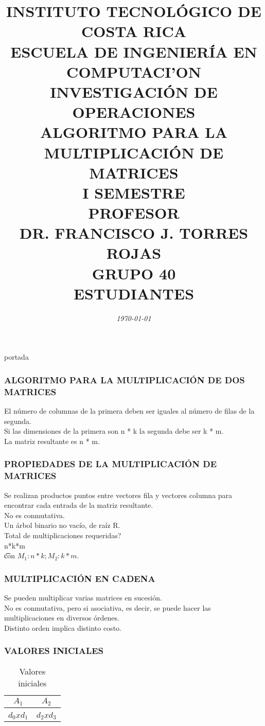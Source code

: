 \documentclass[10]{beamer}
\title{{\color{WHITE} \large \textbf{INSTITUTO TECNOL\'OGICO DE COSTA RICA}} \\ \vspace{0.02cm} 
{\color{WHITE} \large \textbf{ESCUELA DE INGENIER\'IA EN COMPUTACI'ON }} \\ \vspace{0.02cm} 
{\color{WHITE} \large \textbf{INVESTIGACI\'ON DE OPERACIONES  }} \\ \vspace{0.02cm} 
{\color{WHITE} \large \textbf{ALGORITMO PARA LA \\ MULTIPLICACI\'ON DE MATRICES  }} \\ \vspace{0.02cm} 
{\color{WHITE} \large \textbf{I SEMESTRE  }}\\ \vspace{0.02cm}
{\color{WHITE} \large \textbf{PROFESOR}} \\ \vspace{0.02cm}
{\color{WHITE} \large DR. FRANCISCO J. TORRES ROJAS  } \\ \vspace{0.02cm}
{\color{WHITE} \large \textbf{GRUPO 40}} \\ \vspace{0.01cm}
{\color{WHITE} \large \textbf{ESTUDIANTES} }}
\date{\em \color{WHITE} \today}
\begin{document}
\begin{frame}
\color{white}
\titlepage portada
\end{frame} 
\begin{frame}
\color{white}
\frametitle{ALGORITMO PARA LA MULTIPLICACI\'ON DE DOS MATRICES}
El n\'umero de columnas de la primera deben ser iguales al n\'umero de filas de la segunda.
\\ Si las dimensiones de la primera son n * k la segunda debe ser k * m.
\\ La matriz resultante es n * m.
\end{frame} 
\begin{frame}
\color{white}
\frametitle{PROPIEDADES DE LA MULTIPLICACI\'ON DE MATRICES}
Se realizan productos puntos entre vectores fila y vectores columna para encontrar cada entrada de la matriz resultante.
\\ No es conmutativa.
\\Un \'arbol binario no vac\'io, de ra\'iz R.
\\ Total de multiplicaciones requeridas? \\ n*k*m  \\ \t con $M_1:n*k; M_2: k*m$.
\end{frame} 
\begin{frame}
\color{white}
\frametitle{MULTIPLICACI\'ON EN CADENA}
Se pueden multiplicar varias matrices en sucesi\'on.
\\ No es conmutativa, pero si asociativa, es decir, se puede hacer las multiplicaciones en diversos \'ordenes.
\\ Distinto orden implica distinto costo.
\end{frame} 
\begin{frame}\frametitle{VALORES INICIALES}
 \color{white}
\begin{table}
 \begin{tabular}{ c | c }
 \\  $A_1$ & $A_2$  \\ 
 \hline \hline 
  \\ 
 $d_0xd_1$ & $d_2xd_3$   
 \end{tabular}
 \color{white}
\caption{Valores iniciales}
 \end{table}
 \end{frame} 
\end{document}
